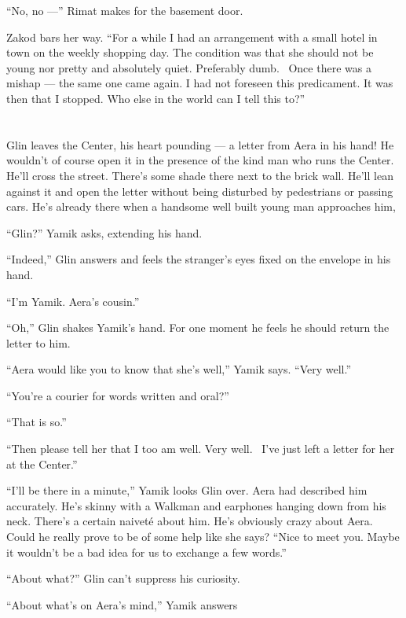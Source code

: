 \documentclass[twoside,11pt,openany]{book}
\begin{document}
``No, no ---'' Rimat makes for the basement door.

Zakod bars her way. ``For a while I had an arrangement with a small hotel in town on the weekly shopping
day. The condition was that she should not be young nor pretty and absolutely quiet. Preferably dumb. ~Once there was a
mishap --- the same one came again. I had not foreseen this predicament. It was then that I stopped. Who else in the
world can I tell this to?''



\chapter{}

Glin leaves the Center, his heart pounding --- a letter from Aera in his hand! He wouldn't of course open it in the
presence of the kind man who runs the Center. He'll cross the street. There's some shade there next to the brick wall.
He'll lean against it and open the letter without being disturbed by pedestrians or passing cars. He's already there
when a handsome well built young man approaches him,

``Glin?'' Yamik asks, extending his hand.

``Indeed,'' Glin answers and feels the stranger's eyes fixed on the envelope in his hand.

``I'm Yamik. Aera's cousin.''

``Oh,'' Glin shakes Yamik's hand. For one moment he feels he should return the letter to him.


``Aera would like you to know that she's well,'' Yamik says. ``Very
well.''

``You're a courier for words written and oral?''

``That is so.''

``Then please tell her that I too am well. Very well.~ I've just left a letter for her at the
Center.''

``I'll be there in a minute,'' Yamik looks Glin over. Aera had described him accurately. He's
skinny with a Walkman and earphones hanging down from his neck. There's a certain naivet\'e about him. He's obviously
crazy about Aera. Could he really prove to be of some help like she says? ``Nice to meet you. Maybe it
wouldn't be a bad idea for us to exchange a few words.''

``About what?'' Glin can't suppress his curiosity.

``About what's on Aera's mind,'' Yamik answers
\end{document}
